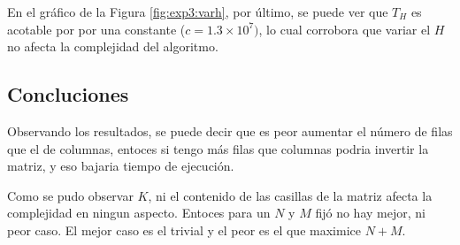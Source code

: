 	En el gráfico de la Figura \ref{fig:exp3:varh}, por último, se puede ver que
	$T_H$ es acotable por por una constante ($c = 1.3 \times 10^7)$, lo cual corrobora que variar el $H$
	no afecta la complejidad del algoritmo.

	\subsection{Concluciones}

	Observando los resultados, se puede decir que es peor aumentar  el número 
	de filas que el de columnas, entoces si tengo más filas que columnas 
	podria invertir la matriz, y eso bajaria tiempo de ejecución.

	Como se pudo observar $K$, ni el contenido de las casillas de la matriz 
	afecta la complejidad en ningun aspecto. Entoces para un $N$ y $M$ fijó 
	no hay mejor, ni peor caso. El mejor caso es el trivial y el peor es el 
	que maximice $N + M$.
